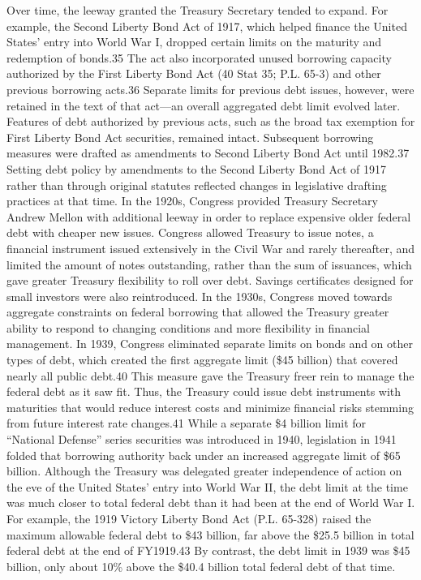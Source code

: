 \newline \newline
Over time, the leeway granted the Treasury Secretary tended to expand. For example, the Second Liberty Bond Act of 1917, which helped finance the United States’ entry into World War I, dropped certain limits on the maturity and redemption of bonds.35 The act also incorporated unused borrowing capacity authorized by the First Liberty Bond Act (40 Stat 35; P.L. 65-3) and other previous borrowing acts.36 Separate limits for previous debt issues, however, were retained in the text of that act—an overall aggregated debt limit evolved later. Features of debt authorized by previous acts, such as the broad tax exemption for First Liberty Bond Act securities, remained intact.
\newline \newline
Subsequent borrowing measures were drafted as amendments to Second Liberty Bond Act until 1982.37 Setting debt policy by amendments to the Second Liberty Bond Act of 1917 rather than through original statutes reflected changes in legislative drafting practices at that time.
\newline \newline
In the 1920s, Congress provided Treasury Secretary Andrew Mellon with additional leeway in order to replace expensive older federal debt with cheaper new issues. Congress allowed Treasury to issue notes, a financial instrument issued extensively in the Civil War and rarely thereafter, and limited the amount of notes outstanding, rather than the sum of issuances, which gave greater Treasury flexibility to roll over debt. Savings certificates designed for small investors were also reintroduced.
\newline \newline
In the 1930s, Congress moved towards aggregate constraints on federal borrowing that allowed the Treasury greater ability to respond to changing conditions and more flexibility in financial management. In 1939, Congress eliminated separate limits on bonds and on other types of debt, which created the first aggregate limit (\$45 billion) that covered nearly all public debt.40 This measure gave the Treasury freer rein to manage the federal debt as it saw fit. Thus, the Treasury could issue debt instruments with maturities that would reduce interest costs and minimize financial risks stemming from future interest rate changes.41 While a separate \$4 billion limit for “National Defense” series securities was introduced in 1940, legislation in 1941 folded that borrowing authority back under an increased aggregate limit of \$65 billion.
\newline \newline
Although the Treasury was delegated greater independence of action on the eve of the United States’ entry into World War II, the debt limit at the time was much closer to total federal debt than it had been at the end of World War I. For example, the 1919 Victory Liberty Bond Act (P.L. 65-328) raised the maximum allowable federal debt to \$43 billion, far above the \$25.5 billion in total federal debt at the end of FY1919.43 By contrast, the debt limit in 1939 was \$45 billion, only about 10\% above the \$40.4 billion total federal debt of that time.

